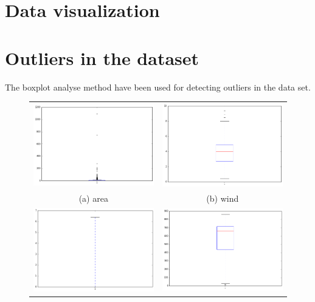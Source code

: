 \newpage
\section{Data visualization}

\section*{Outliers in the dataset}
The boxplot analyse method have been used for detecting outliers in the data set. 

\begin{figure}
\begin{tabular}{cc}
  \includegraphics[width=65mm]{images/boxplots/area.png} &   \includegraphics[width=65mm]{images/boxplots/wind.png} \\
(a) area & (b) wind \\[6pt]
 \includegraphics[width=65mm]{images/boxplots/rain.png} &   \includegraphics[width=65mm]{images/boxplots/DC.png} \\

\end{tabular}
\end{figure}
